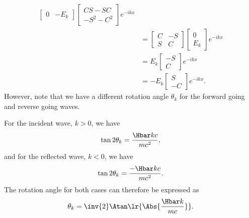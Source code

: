 {\begin{equation}
\begin{aligned}
\begin{bmatrix}
0 & -E_k
\end{bmatrix}
\begin{bmatrix}
C S - S C \\
-S^2 - C^2
\end{bmatrix}
e^{-i k x}
\\ &=
\begin{bmatrix}
C & - S \\
S & C
\end{bmatrix}
\begin{bmatrix}
0 \\
E_k
\end{bmatrix}
e^{-i k x}
\\ &=
E_k
\begin{bmatrix}
- S \\
C
\end{bmatrix}
e^{-i k x}
\\ &=
-E_k
\begin{bmatrix}
S \\
-C
\end{bmatrix}
e^{-i k x}.
\end{aligned}
\end{equation}
%
However, note that we have a different rotation angle \( \theta_k \) for the forward going and reverse going waves.

For the incident wave, \( k > 0 \), we have
%
\begin{equation}\label{eqn:qmLecture9Problems:720}
\tan 2 \theta_k = \frac{ \Hbar k c }{ m c^2 },
\end{equation}
%
and for the reflected wave, \( k < 0 \), we have
%
\begin{equation}\label{eqn:qmLecture9Problems:740}
\tan 2 \theta_k = \frac{ -\Hbar k c }{ m c^2 }.
\end{equation}
%
The rotation angle for both cases can therefore be expressed as
%
\begin{equation}\label{eqn:qmLecture9Problems:760}
\theta_k = \inv{2} \Atan\lr{ \Abs{\frac{\Hbar k }{m c}} }.
\end{equation}
%
} %
%
%
